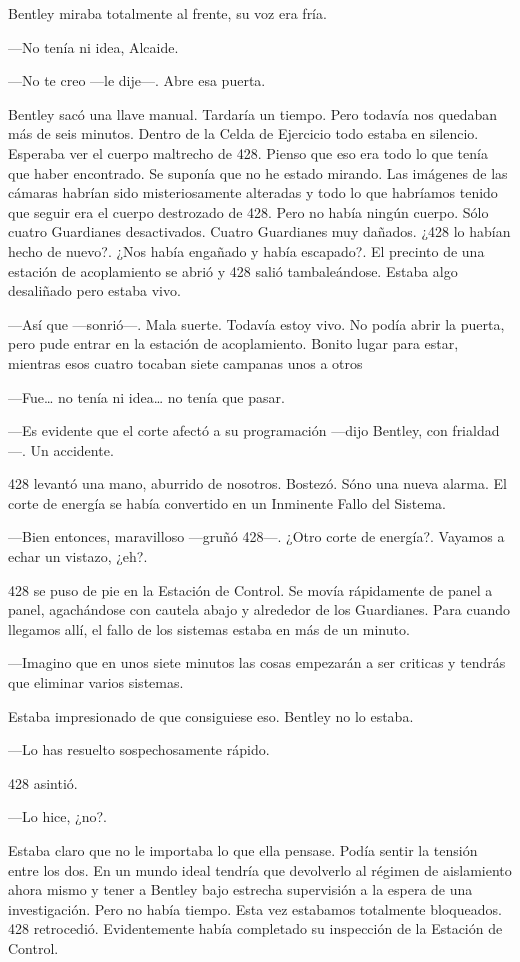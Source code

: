 Bentley miraba totalmente al frente, su voz era fría.

---No tenía ni idea, Alcaide.

---No te creo ---le dije---. Abre esa puerta.

Bentley sacó una llave manual. Tardaría un tiempo. Pero todavía nos
quedaban más de seis minutos. Dentro de la Celda de Ejercicio todo
estaba en silencio. Esperaba ver el cuerpo maltrecho de 428. Pienso que
eso era todo lo que tenía que haber encontrado. Se suponía que no he
estado mirando. Las imágenes de las cámaras habrían sido misteriosamente
alteradas y todo lo que habríamos tenido que seguir era el cuerpo
destrozado de 428. Pero no había ningún cuerpo. Sólo cuatro Guardianes
desactivados. Cuatro Guardianes muy dañados. ¿428 lo habían hecho de
nuevo?. ¿Nos había engañado y había escapado?. El precinto de una
estación de acoplamiento se abrió y 428 salió tambaleándose. Estaba algo
desaliñado pero estaba vivo.

---Así que ---sonrió---. Mala suerte. Todavía estoy vivo. No podía abrir
la puerta, pero pude entrar en la estación de acoplamiento. Bonito lugar
para estar, mientras esos cuatro tocaban siete campanas unos a otros

---Fue\ldots{} no tenía ni idea\ldots{} no tenía que pasar.

---Es evidente que el corte afectó a su programación ---dijo Bentley,
con frialdad---. Un accidente.

428 levantó una mano, aburrido de nosotros. Bostezó. Sóno una nueva
alarma. El corte de energía se había convertido en un Inminente Fallo
del Sistema.

---Bien entonces, maravilloso ---gruñó 428---. ¿Otro corte de energía?.
Vayamos a echar un vistazo, ¿eh?.

428 se puso de pie en la Estación de Control. Se movía rápidamente de
panel a panel, agachándose con cautela abajo y alrededor de los
Guardianes. Para cuando llegamos allí, el fallo de los sistemas estaba
en más de un minuto.

---Imagino que en unos siete minutos las cosas empezarán a ser criticas
y tendrás que eliminar varios sistemas.

Estaba impresionado de que consiguiese eso. Bentley no lo estaba.

---Lo has resuelto sospechosamente rápido.

428 asintió.

---Lo hice, ¿no?.

Estaba claro que no le importaba lo que ella pensase. Podía sentir la
tensión entre los dos. En un mundo ideal tendría que devolverlo al
régimen de aislamiento ahora mismo y tener a Bentley bajo estrecha
supervisión a la espera de una investigación. Pero no había tiempo. Esta
vez estabamos totalmente bloqueados. 428 retrocedió. Evidentemente había
completado su inspección de la Estación de Control.

